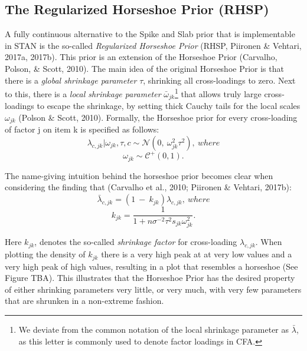 \documentclass[
  man, donotrepeattitle,floatsintext]{apa6}
\begin{document}
\hypertarget{the-regularized-horseshoe-prior-rhsp}{%
\subsection{The Regularized Horseshoe Prior (RHSP)}\label{the-regularized-horseshoe-prior-rhsp}}

A fully continuous alternative to the Spike and Slab prior that is implementable in STAN is the so-called \emph{Regularized Horseshoe Prior} (RHSP, Piironen \& Vehtari, 2017a, 2017b). This prior is an extension of the Horseshoe Prior (Carvalho, Polson, \& Scott, 2010). The main idea of the original Horseshoe Prior is that there is a \emph{global shrinkage parameter} \(\tau\), shrinking all cross-loadings to zero. Next to this, there is a \emph{local shrinkage parameter} \(\bar{\omega}_{jk}\)\footnote{We deviate from the common notation of the local shrinkage parameter as \(\bar{\lambda}\), as this letter is commonly used to denote factor loadings in CFA.} that allows truly large cross-loadings to escape the shrinkage, by setting thick Cauchy tails for the local scales \(\omega_{jk}\) (Polson \& Scott, 2010). Formally, the Horseshoe prior for every cross-loading of factor j on item k is specified as follows:
\[\lambda_{c,jk} | \omega_{jk}, \tau, c\sim \mathcal{N}(0, \ \omega^2_{jk} \tau^2), \ where\]
\[\omega_{jk} \sim \mathcal{C^+}(0, 1).\]

The name-giving intuition behind the horseshoe prior becomes clear when considering the finding that (Carvalho et al., 2010; Piironen \& Vehtari, 2017b):
\[\bar{\lambda}_{c,jk} = (1 \ - \ k_{jk}) \hat{\lambda}_{c,jk}, \ where\]
\[k_{jk} = \frac{1}{1 + n \sigma^{-2}\tau^2s_{jk}\omega^2_{jk}}.\]

Here \(k_{jk}\), denotes the so-called \emph{shrinkage factor} for cross-loading \(\lambda_{c,jk}\).
When plotting the density of \(k_{jk}\) there is a very high peak at at very low values and a very high peak of high values, resulting in a plot that resembles a horseshoe (See Figure TBA). This illustrates that the Horseshoe Prior has the desired property of either shrinking parameters very little, or very much, with very few parameters that are shrunken in a non-extreme fashion.
\end{document}
